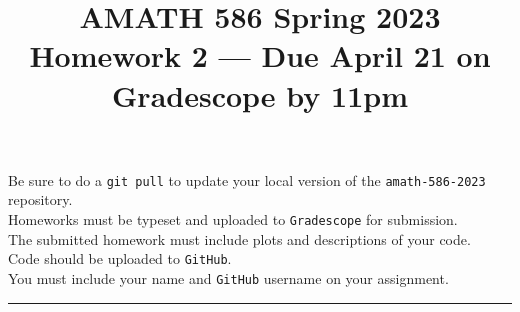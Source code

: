 \documentclass[10pt]{amsart}
\begin{document}
\pagestyle{empty}

\newcommand{\mline}{\vspace{.2in}\hrule\vspace{.2in}}


\title{\bf { AMATH 586 Spring 2023 \\ Homework 2 ---
Due April 21 on Gradescope by 11pm} }
\maketitle
\begin{center} Be sure to do a {\tt git pull} to update your local
  version of the {\tt amath-586-2023} repository.\\  Homeworks must be
  typeset and uploaded to {\tt Gradescope} for submission.\\
  The submitted homework must include plots and descriptions of your code.\\
  Code should be uploaded to {\tt GitHub}.\\
  You must include your name and {\tt GitHub} username on your assignment.
  \end{center}

  \mline
  
\end{document}
